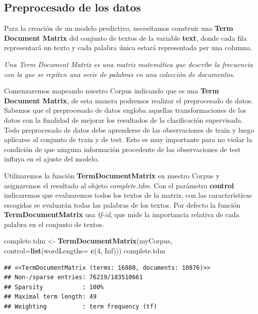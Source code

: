 \documentclass[]{article}
\newenvironment{Shaded}{\begin{snugshade}}{\end{snugshade}}
\newcommand{\DataTypeTok}[1]{\textcolor[rgb]{0.13,0.29,0.53}{#1}}
\newcommand{\DecValTok}[1]{\textcolor[rgb]{0.00,0.00,0.81}{#1}}
\newcommand{\KeywordTok}[1]{\textcolor[rgb]{0.13,0.29,0.53}{\textbf{#1}}}
\newcommand{\NormalTok}[1]{#1}
\newcommand{\OtherTok}[1]{\textcolor[rgb]{0.56,0.35,0.01}{#1}}
\newcommand{\StringTok}[1]{\textcolor[rgb]{0.31,0.60,0.02}{#1}}
\begin{document}
\hypertarget{preprocesado-de-los-datos}{%
\subsection{Preprocesado de los datos}\label{preprocesado-de-los-datos}}

Para la creación de un modelo predictivo, necesitamos construir una
\textbf{Term Document Matrix} del conjunto de textos de la variable
\textbf{text}, donde cada fila representará un texto y cada palabra
única estará representada per una columna.

\emph{Una Term Document Matrix es una matriz matemática que describe la
frecuencia con la que se repiten una serie de palabras en una colección
de documentos.}

Comenzaremos mapeando nuestro Corpus indicando que es una \textbf{Term
Document Matrix}, de esta manera podremos realizar el preprocesado de
datos. Sabemos que el preprocesado de datos engloba aquellas
transformaciones de los datos con la finalidad de mejorar los resultados
de la clasificación supervisada. Todo preprocesado de datos debe
aprenderse de las observaciones de train y luego aplicarse al conjunto
de train y de test. Esto es muy importante para no violar la condición
de que ninguna información procedente de las observaciones de test
influya en el ajuste del modelo.

Utilizaremos la función \textbf{TermDocumentMatrix} en nuestro Corpus y
asignaremos el resultado al objeto \emph{complete.tdm}. Con el parámetro
\textbf{control} indicaremos que evaluaremos todos los textos de la
matriz, con las características escogidas se evaluarán todas las
palabras de los textos. Por defecto la función
\textbf{TermDocumentMatrix} usa \emph{tf-id}, que mide la importancia
relativa de cada palabra en el conjunto de textos.

\begin{Shaded}
\begin{Highlighting}[]
\NormalTok{complete.tdm <-}\StringTok{ }\KeywordTok{TermDocumentMatrix}\NormalTok{(myCorpus, }\DataTypeTok{control=}\KeywordTok{list}\NormalTok{(}\DataTypeTok{wordLengths=} \KeywordTok{c}\NormalTok{(}\DecValTok{4}\NormalTok{, }\OtherTok{Inf}\NormalTok{)))}
\NormalTok{complete.tdm}
\end{Highlighting}
\end{Shaded}

\begin{verbatim}
## <<TermDocumentMatrix (terms: 16880, documents: 10876)>>
## Non-/sparse entries: 76219/183510661
## Sparsity           : 100%
## Maximal term length: 49
## Weighting          : term frequency (tf)
\end{verbatim}
\end{document}
